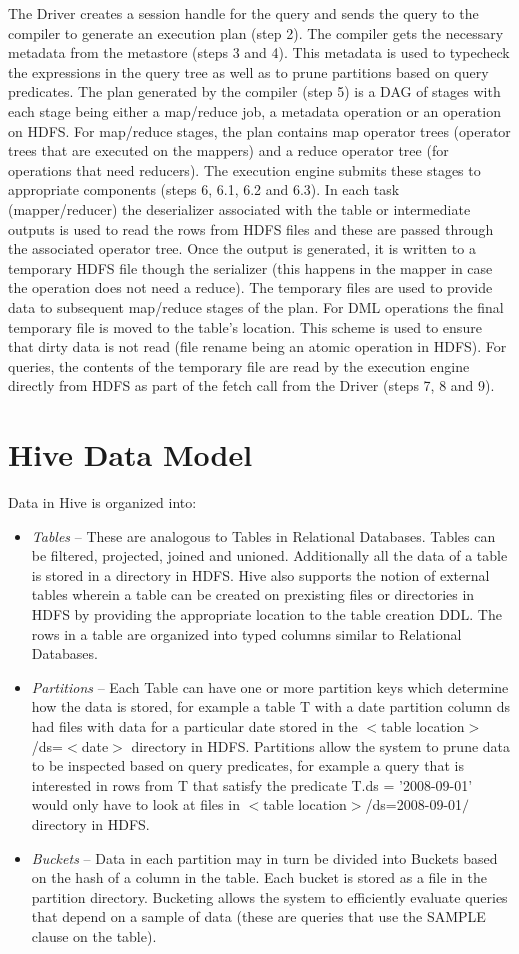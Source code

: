 \documentclass[twocolumn]{article}
\newcommand{\bi}{\begin{itemize}}
\newcommand{\ei}{\end{itemize}}
\newcommand{\ii}{\item}
\begin{document}
The Driver creates a session handle for the query and sends the query to the compiler to generate an execution plan (step 2). 
The compiler gets the necessary metadata from the metastore (steps 3 and 4). 
This metadata is used to typecheck the expressions in the query tree as well as to prune partitions based on query predicates. 
The plan generated by the compiler (step 5) is a DAG of stages with each stage being either a map/reduce job, a metadata operation or an operation on HDFS. For map/reduce stages, the plan contains map operator trees (operator trees that are executed on the mappers) and a reduce operator tree (for operations that need reducers). 
The execution engine submits these stages to appropriate components (steps 6, 6.1, 6.2 and 6.3). 
In each task (mapper/reducer) the deserializer associated with the table or intermediate outputs is used to read the rows from HDFS files and these are passed through the associated operator tree. Once the output is generated, it is written to a temporary HDFS file though the serializer (this happens in the mapper in case the operation does not need a reduce). 
The temporary files are used to provide data to subsequent map/reduce stages of the plan. For DML operations the final temporary file is moved to the table's location. 
This scheme is used to ensure that dirty data is not read (file rename being an atomic operation in HDFS). For queries, the contents of the temporary file are read by the execution engine directly from HDFS as part of the fetch call from the Driver (steps 7, 8 and 9).

\section{Hive Data Model}
Data in Hive is organized into:
\bi
\ii \textit{Tables} – These are analogous to Tables in Relational Databases. Tables can be filtered, projected, joined and unioned. Additionally all the data of a table is stored in a directory in HDFS. Hive also supports the notion of external tables wherein a table can be created on prexisting files or directories in HDFS by providing the appropriate location to the table creation DDL. The rows in a table are organized into typed columns similar to Relational Databases.
\ii \textit{Partitions} – Each Table can have one or more partition keys which determine how the data is stored, for example a table T with a date partition column ds had files with data for a particular date stored in the $<$table location$>$/ds=$<$date$>$ directory in HDFS. Partitions allow the system to prune data to be inspected based on query predicates, for example a query that is interested in rows from T that satisfy the predicate T.ds = '2008-09-01' would only have to look at files in $<$table location$>$/ds=2008-09-01$/$ directory in HDFS.
\ii \textit{Buckets} – Data in each partition may in turn be divided into Buckets based on the hash of a column in the table. Each bucket is stored as a file in the partition directory. Bucketing allows the system to efficiently evaluate queries that depend on a sample of data (these are queries that use the SAMPLE clause on the table).
\ei
\end{document}
